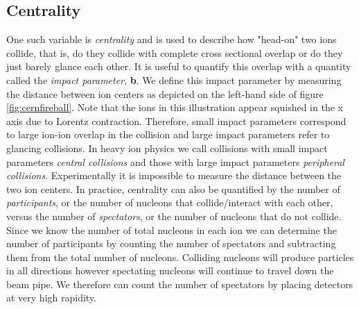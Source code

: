 \subsection{Centrality} \label{sect:centrality}
One such variable is \textit{centrality} and is used to describe how "head-on" two ions collide, that is, do they collide with complete cross sectional overlap or do they just barely glance each other. It is useful to quantify this overlap with a quantity called the \textit{impact parameter}, \textbf{b}. We define this impact parameter by measuring the distance between ion centers as depicted on the left-hand side of figure \ref{fig:cernfireball}. Note that the ions in this illustration appear squished in the x axis due to Lorentz contraction. Therefore, small impact parameters correspond to large ion-ion overlap in the collision and large impact parameters refer to glancing collisions. In heavy ion physics we call collisions with small impact parameters \textit{central collisions} and those with large impact parameters \textit{peripheral collisions}. Experimentally it is impossible to measure the distance between the two ion centers. In practice, centrality can also be quantified by the number of \textit{participants}, or the number of nucleons that collide/interact with each other, versus the number of \textit{spectators}, or the number of nucleons that do not collide. Since we know the number of total nucleons in each ion we can determine the number of participants by counting the number of spectators and subtracting them from the total number of nucleons. Colliding nucleons will produce particles in all directions however spectating nucleons will continue to travel down the beam pipe. We therefore can count the number of spectators by placing detectors at very high rapidity.

